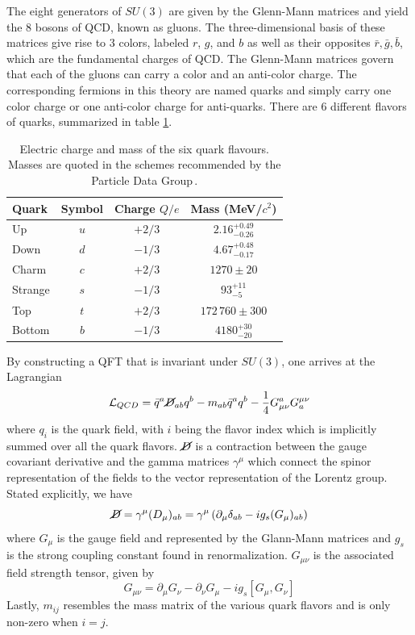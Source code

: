 The eight generators of $SU(3)$ are given by the Glenn-Mann matrices and yield the 8 bosons of QCD, known as gluons. The three-dimensional basis of these matrices give rise to 3 colors, labeled $r$, $g$, and $b$ as well as their opposites $\bar{r}, \bar{g}, \bar{b}$, which are the fundamental charges of QCD. The Glenn-Mann matrices govern that each of the gluons can carry a color and an anti-color charge. The corresponding fermions in this theory are named quarks and simply carry one color charge or one anti-color charge for anti-quarks. There are 6 different flavors of quarks, summarized in table \ref{tab:quark_masses}. 

\begin{table}[htbp]
    \centering
    \begin{tabular}{@{}lccc@{}}
      \toprule
      Quark & Symbol & Charge $Q/e$ & Mass (MeV/$c^{2}$) \\ 
      \midrule
      Up     & $u$ & $+2/3$ & $2.16^{+0.49}_{-0.26}$ \\
      Down   & $d$ & $-1/3$ & $4.67^{+0.48}_{-0.17}$ \\
      Charm  & $c$ & $+2/3$ & $1270 \pm 20$ \\
      Strange& $s$ & $-1/3$ & $93^{+11}_{-5}$ \\
      Top    & $t$ & $+2/3$ & $172\,760 \pm 300$ \\
      Bottom & $b$ & $-1/3$ & $4180^{+30}_{-20}$ \\
      \bottomrule
    \end{tabular}
    \caption{Electric charge and mass of the six quark flavours.
             Masses are quoted in the schemes recommended by the
             Particle Data Group\,\cite{ref:pdg2024}.}
    \label{tab:quark_masses}
  \end{table}


By constructing a QFT that is invariant under $SU(3)$, one arrives at the Lagrangian
\begin{equation}
    \mathcal{L}_{{QCD}} = \bar{q}^a\cancel{D}_{ab}q^b - m_{ab}\bar{q}^aq^b - \frac{1}{4}G^a_{\mu\nu}G_a^{\mu\nu}
\end{equation}
where $q_i$ is the quark field, with $i$ being the flavor index which is implicitly summed over all the quark flavors. $\cancel{D}$ is a contraction between the gauge covariant derivative and the gamma matrices $\gamma^\mu$ which connect the spinor representation of the fields to the vector representation of the Lorentz group. Stated explicitly, we have
\begin{equation}
    \cancel{D} = \gamma^\mu (D_\mu)_{ab} = \gamma^\mu\left( \partial_\mu \delta_{ab}  - ig_s(G_\mu)_{ab}\right)
\end{equation}
where $G_\mu$ is the gauge field and represented by the Glann-Mann matrices and $g_s$ is the strong coupling constant found in renormalization. $G_{\mu\nu}$ is the associated field strength tensor, given by
\begin{equation}
G_{\mu\nu} = \partial_\mu G_\nu - \partial_\nu G_\mu - ig_s[G_\mu, G_\nu]
\end{equation}
Lastly, $m_{ij}$ resembles the mass matrix of the various quark flavors and is only non-zero when $i=j$.

